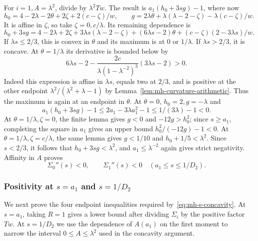 For $i=1,A=\lambda^2$, divide by $\lambda^2Tw$. The result is $a_1(h_0+3sg)-1$, where now
\[
 h_0=4-2\lambda-2\theta+2\zeta+2(c-\zeta)/w,
 \qquad g=2\lambda\theta+\lambda(\lambda-2-\zeta)-\lambda(c-\zeta)/w.
\]
It is affine in $\zeta$, so take $\zeta=0,c/\lambda$. Its remaining dependence is
\[
 h_0+3sg=4-2\lambda+2\zeta+3\lambda s(\lambda-2-\zeta)
 +(6\lambda s-2)\theta+(c-\zeta)(2-3\lambda s)/w.
\]
If $\lambda s\le2/3$, this is convex in $\theta$ and its maximum is at $0$ or $1/\lambda$. If $\lambda s>2/3$, it is concave. At $\theta=1/\lambda$ its derivative is bounded below by
\[
 6\lambda s-2-\frac{2c}{\lambda(1-\lambda^{-2})^3}(3\lambda s-2)>0.
\]
Indeed this expression is affine in $\lambda s$, equals two at $2/3$, and is positive at the other endpoint $\lambda^2/(\lambda^2+\lambda-1)$ by Lemma~\ref{lem:mh-curvature-arithmetic}. Thus the maximum is again at an endpoint in $\theta$.
At $\theta=0$, $h_0=2,g=-\lambda$ and
\[
 a_1(h_0+3sg)-1\le2a_1-3\lambda a_1^2-1
 \le1/(3\lambda)-1<0.
\]
At $\theta=1/\lambda,\zeta=0$, the finite lemma gives $g<0$ and $-12g>h_0^2$; since $s\ge a_1$, completing the square in $a_1$ gives an upper bound $h_0^2/(-12g)-1<0$.
At $\theta=1/\lambda,\zeta=c/\lambda$, the same lemma gives $g<1/10$ and $h_0+1/5<\lambda^2$. Since $s<2/3$, it follows that $h_0+3sg<\lambda^2$, and $a_1\le\lambda^{-2}$ again gives strict negativity. Affinity in $A$ proves
\begin{equation}\label{eq:mh-s-concavity}
 \Sigma_0''(s)<0,\qquad\Sigma_1''(s)<0
 \quad(a_1\le s\le1/D_2).
\end{equation}

\subsubsection{Positivity at \texorpdfstring{$s=a_1$ and $s=1/D_2$}{s = a1 and s = 1/D2}}
We next prove the four endpoint inequalities required by~\eqref{eq:mh-s-concavity}. At $s=a_1$, taking $R=1$ gives a lower bound after dividing $\Sigma_i$ by the positive factor $Tw$. At $s=1/D_2$ we use the dependence of $A(a_1)$ on the first moment to narrow the interval $0\le A\le\lambda^2$ used in the concavity argument.

